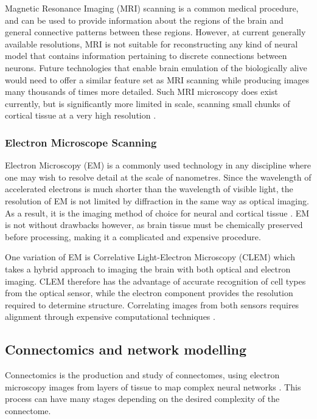 Magnetic Resonance Imaging (MRI) scanning is a common medical procedure, and can
be used to provide information about the regions of the brain and general
connective patterns between these regions. However, at current generally
available resolutions, MRI is not suitable for reconstructing any kind of neural
model that contains information pertaining to discrete connections between
neurons. Future technologies that enable brain emulation of the
biologically alive would need to offer a similar feature set as MRI scanning
while producing images many thousands of times more detailed. Such MRI
microscopy does exist currently, but is significantly more limited in scale,
scanning small chunks of cortical tissue at a very high resolution
\autocite{johnson_three-dimensional_1987,bostrom_whole_2008}.

\subsubsection*{Electron Microscope Scanning}

Electron Microscopy (EM) is a commonly used technology in any discipline where
one may wish to resolve detail at the scale of nanometres. Since the wavelength
of accelerated electrons is much shorter than the wavelength of visible light,
the resolution of EM is not limited by diffraction in the same way as optical
imaging. As a result, it is the imaging method of choice for neural and cortical
tissue \autocite{marc_retinal_2013, kaynig_large-scale_2015}. EM is not without
drawbacks however, as brain tissue must be chemically preserved before
processing, making it a complicated and expensive procedure. 

One variation of EM is Correlative Light-Electron Microscopy (CLEM) which takes
a hybrid approach to imaging the brain with both optical and electron imaging.
CLEM therefore has the advantage of accurate recognition of cell types from the
optical sensor, while the electron component provides the resolution required to
determine structure. Correlating images from both sensors requires alignment
through expensive computational techniques \autocite{voortman_integration_2014}.


\subsection{Connectomics and network modelling}
Connectomics is the production and study of connectomes, using electron
microscopy images from layers of tissue to map complex neural networks
\autocite{marc_retinal_2013}. This process can have many stages depending on the
desired complexity of the connectome. 

